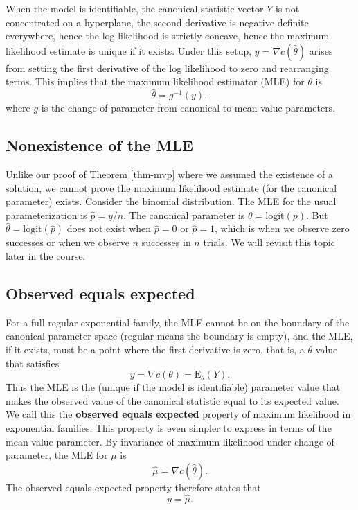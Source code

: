 \documentclass[
]{article}
\begin{document}
When the model is identifiable, the canonical statistic vector \(Y\) is
not concentrated on a hyperplane, the second derivative is negative
definite everywhere, hence the log likelihood is strictly concave, hence
the maximum likelihood estimate is unique if it exists. Under this
setup, \(y = \nabla c(\hat{\theta})\) arises from setting the first
derivative of the log likelihood to zero and rearranging terms. This
implies that the maximum likelihood estimator (MLE) for \(\theta\) is \[
  \hat{\theta} = g^{-1}(y),
\] where \(g\) is the change-of-parameter from canonical to mean value
parameters.

\vspace{0.5cm}


\hypertarget{nonexistence-of-the-mle}{%
\subsection{Nonexistence of the MLE}\label{nonexistence-of-the-mle}}

Unlike our proof of Theorem \ref{thm-mvp} where we assumed the existence
of a solution, we cannot prove the maximum likelihood estimate (for the
canonical parameter) exists. Consider the binomial distribution. The MLE
for the usual parameterization is \(\hat p = y/n\). The canonical
parameter is \(\theta = \text{logit}(p)\). But
\(\hat \theta = \text{logit}(\hat p)\) does not exist when
\(\hat p = 0\) or \(\hat p = 1\), which is when we observe zero
successes or when we observe \(n\) successes in \(n\) trials. We will
revisit this topic later in the course.

\hypertarget{observed-equals-expected}{%
\subsection{Observed equals expected}\label{observed-equals-expected}}

For a full regular exponential family, the MLE cannot be on the boundary
of the canonical parameter space (regular means the boundary is empty),
and the MLE, if it exists, must be a point where the first derivative is
zero, that is, a \(\theta\) value that satisfies \[
  y = \nabla c(\theta) = \mathrm{E}_\theta(Y).
\] Thus the MLE is the (unique if the model is identifiable) parameter
value that makes the observed value of the canonical statistic equal to
its expected value. We call this the \textbf{observed equals expected}
property of maximum likelihood in exponential families. This property is
even simpler to express in terms of the mean value parameter. By
invariance of maximum likelihood under change-of-parameter, the MLE for
\(\mu\) is \[
  \hat\mu = \nabla c(\hat\theta).
\] The observed equals expected property therefore states that
\begin{equation} \label{obsequalsexp}
  y = \hat\mu.
\end{equation}
\end{document}
